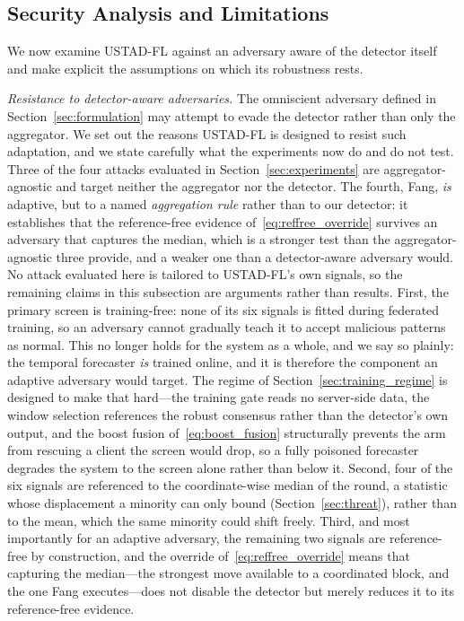 \documentclass[journal]{IEEEtran}
\begin{document}
\subsection{Security Analysis and Limitations}
\label{sec:security}
We now examine USTAD-FL against an adversary aware of the detector itself and make explicit the assumptions on which its robustness rests.

\noindent\textit{Resistance to detector-aware adversaries.} The omniscient adversary defined in Section~\ref{sec:formulation} may attempt to evade the detector rather than only the aggregator. We set out the reasons USTAD-FL is designed to resist such adaptation, and we state carefully what the experiments now do and do not test. Three of the four attacks evaluated in Section~\ref{sec:experiments} are aggregator-agnostic and target neither the aggregator nor the detector. The fourth, Fang, \emph{is} adaptive, but to a named \emph{aggregation rule} rather than to our detector: it establishes that the reference-free evidence of~\eqref{eq:reffree_override} survives an adversary that captures the median, which is a stronger test than the aggregator-agnostic three provide, and a weaker one than a detector-aware adversary would. No attack evaluated here is tailored to USTAD-FL's own signals, so the remaining claims in this subsection are arguments rather than results. First, the primary screen is training-free: none of its six signals is fitted during federated training, so an adversary cannot gradually teach it to accept malicious patterns as normal. This no longer holds for the system as a whole, and we say so plainly: the temporal forecaster \emph{is} trained online, and it is therefore the component an adaptive adversary would target. The regime of Section~\ref{sec:training_regime} is designed to make that hard---the training gate reads no server-side data, the window selection references the robust consensus rather than the detector's own output, and the boost fusion of~\eqref{eq:boost_fusion} structurally prevents the arm from rescuing a client the screen would drop, so a fully poisoned forecaster degrades the system to the screen alone rather than below it. Second, four of the six signals are referenced to the coordinate-wise median of the round, a statistic whose displacement a minority can only bound (Section~\ref{sec:threat}), rather than to the mean, which the same minority could shift freely. Third, and most importantly for an adaptive adversary, the remaining two signals are reference-free by construction, and the override of~\eqref{eq:reffree_override} means that capturing the median---the strongest move available to a coordinated block, and the one Fang executes---does not disable the detector but merely reduces it to its reference-free evidence.
\end{document}
